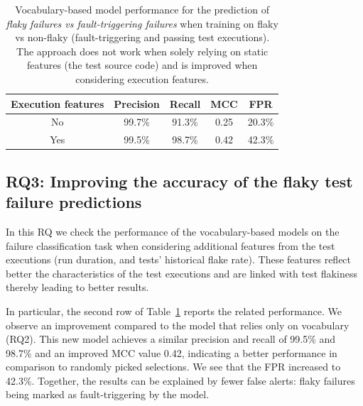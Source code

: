 \begin{table}[ht]
\caption{Vocabulary-based model performance for the prediction of \textit{flaky failures vs fault-triggering failures} when training on flaky vs non-flaky (fault-triggering and passing test executions). The approach does not work when solely relying on static features (\ie the test source code) and is improved when considering execution features.}
\label{table:rq2and3}
\centering
\begin{tabular}{c|c|c|c|c} 
 \toprule
 \textbf{Execution features} & \textbf{Precision} & \textbf{Recall} & \textbf{MCC} & \textbf{FPR} \\ [0.5ex] 
 \midrule
 No & 99.7\% & 91.3\% & 0.25 & 20.3\%\\ 
 Yes & 99.5\% & 98.7\% & 0.42 & 42.3\%\\ 
 \bottomrule
\end{tabular}
\vspace{-1.3em}
\end{table} 


\subsection{RQ3: Improving the accuracy of the flaky test failure predictions}

In this RQ we check the performance of the vocabulary-based models on the failure classification task when considering additional features from the test executions (run duration, and tests' historical flake rate). These features reflect better the characteristics of the test executions and are linked with test flakiness thereby leading to better results. 

In particular, the second row of Table~\ref{table:rq2and3} reports the related performance. We observe an improvement compared to the model that relies only on vocabulary (RQ2). This new model achieves a similar precision and recall of 99.5\% and 98.7\% and an improved MCC value 0.42, indicating a better performance in comparison to randomly picked selections. We see that the FPR increased to 42.3\%. Together, the results can be explained by fewer false alerts: flaky failures being marked as fault-triggering by the model. 

